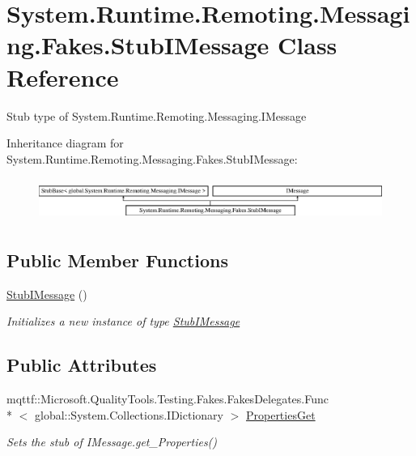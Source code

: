 \hypertarget{class_system_1_1_runtime_1_1_remoting_1_1_messaging_1_1_fakes_1_1_stub_i_message}{\section{System.\-Runtime.\-Remoting.\-Messaging.\-Fakes.\-Stub\-I\-Message Class Reference}
\label{class_system_1_1_runtime_1_1_remoting_1_1_messaging_1_1_fakes_1_1_stub_i_message}
}


Stub type of System.\-Runtime.\-Remoting.\-Messaging.\-I\-Message 


Inheritance diagram for System.\-Runtime.\-Remoting.\-Messaging.\-Fakes.\-Stub\-I\-Message\-:\begin{figure}[H]
\begin{center}
\leavevmode
\includegraphics[height=1.396509cm]{class_system_1_1_runtime_1_1_remoting_1_1_messaging_1_1_fakes_1_1_stub_i_message}
\end{center}
\end{figure}
\subsection*{Public Member Functions}
\begin{DoxyCompactItemize}
\item 
\hyperlink{class_system_1_1_runtime_1_1_remoting_1_1_messaging_1_1_fakes_1_1_stub_i_message_a774d5b00f3d431f6c284d5d36b6c4ff4}{Stub\-I\-Message} ()
\begin{DoxyCompactList}\small\item\em Initializes a new instance of type \hyperlink{class_system_1_1_runtime_1_1_remoting_1_1_messaging_1_1_fakes_1_1_stub_i_message}{Stub\-I\-Message}\end{DoxyCompactList}\end{DoxyCompactItemize}
\subsection*{Public Attributes}
\begin{DoxyCompactItemize}
\item 
mqttf\-::\-Microsoft.\-Quality\-Tools.\-Testing.\-Fakes.\-Fakes\-Delegates.\-Func\\*
$<$ global\-::\-System.\-Collections.\-I\-Dictionary $>$ \hyperlink{class_system_1_1_runtime_1_1_remoting_1_1_messaging_1_1_fakes_1_1_stub_i_message_a7e2687542127368f31522259d47102bc}{Properties\-Get}
\begin{DoxyCompactList}\small\item\em Sets the stub of I\-Message.\-get\-\_\-\-Properties()\end{DoxyCompactList}\end{DoxyCompactItemize}


